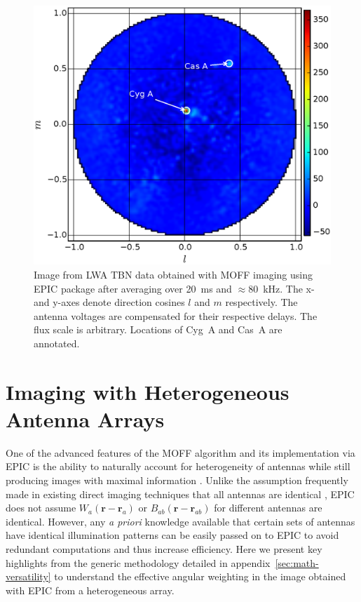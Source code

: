 \documentclass[a4paper,fleqn,usenatbib]{mnras}
\begin{document}
\begin{figure}
  \includegraphics[width=\columnwidth]{figure9}
  \caption{Image from LWA TBN data obtained with MOFF imaging using EPIC 
    package after averaging over 20~ms and $\approx 80$~kHz. The x- and y-axes
    denote direction cosines $l$ and $m$ respectively. The antenna voltages
    are compensated for their respective delays. The flux scale is arbitrary.
    Locations of Cyg~A and Cas~A are annotated.}
  \label{fig:LWA-image}
\end{figure}

\section{Imaging with Heterogeneous Antenna Arrays}\label{sec:versatility}

One of the advanced features of the MOFF algorithm and its implementation via EPIC is the ability to naturally account for heterogeneity of antennas while still producing images with maximal information \citep{mor11}. Unlike the assumption frequently made in existing direct imaging techniques that all antennas are identical \citep{oto94,dai00,teg09,teg10,fos14,zhe14}, EPIC does not assume $W_a(\mathbf{r}-\mathbf{r}_a)$ or $B_{ab}(\mathbf{r}-\mathbf{r}_{ab})$ for different antennas are identical. However, any {\it a priori} knowledge available that certain sets of antennas have identical illumination patterns can be easily passed on to EPIC to avoid redundant computations and thus increase efficiency. Here we present key highlights from the generic methodology detailed in appendix~\ref{sec:math-versatility} to understand the effective angular weighting in the image obtained with EPIC from a heterogeneous array. 
\end{document}
